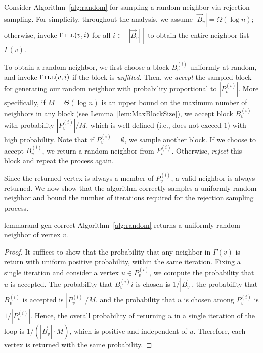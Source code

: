 Consider Algorithm~\ref{alg:random} for sampling a random neighbor via rejection sampling.
For simplicity, throughout the analysis, we assume $|\vec B_v| = \Omega(\log n)$;
otherwise, invoke $\texttt{\textsc{Fill}}(v,i)$ for all $i \in [|\vec B_v|]$ to obtain the entire neighbor list $\Gamma(v)$.

To obtain a random neighbor, we first choose a block $B^{(i)}_v$ uniformly at random, and invoke $\texttt{\textsc{Fill}}(v,i)$ if the block is \emph{unfilled}.
Then, we \emph{accept} the sampled block for generating our random neighbor with probability proportional to $|P_v^{(i)}|$.
More specifically, if $M = \Theta(\log n)$ is an upper bound on the maximum number of neighbors in any block (see Lemma~\ref{lem:MaxBlockSize}),
we accept block $B^{(i)}_v$ with probability $|P_v^{(i)}|/M$, which is well-defined (i.e., does not exceed $1$) with high probability.
Note that if $P_v^{(i)} = \emptyset$, we sample another block.
If we choose to accept $B^{(i)}_v$, we return a random neighbor from $P_v^{(i)}$.
Otherwise, \emph{reject} this block and repeat the process again.

Since the returned vertex is always a member of $P_v^{(i)}$, a valid neighbor is always returned.
We now show that the algorithm correctly samples a uniformly random neighbor
and bound the number of iterations required for the rejection sampling process.
\begin{restatable}{lemma}{rand-gen-correct}
\label{lem:rand_gen_correct}
Algorithm~\ref{alg:random} returns a uniformly random neighbor of vertex $v$.
\end{restatable}
\begin{proof}
It suffices to show that the probability that any neighbor in $\Gamma(v)$ is return with uniform positive probability, within the same iteration.
Fixing a single iteration and consider a vertex $u\in P_v^{(i)}$, we compute the probability that $u$ is accepted.
The probability that $B^{(i)}_vi$ is chosen is $1/|\vec B_v|$, the probability that $B^{(i)}_v$ is accepted is $|P_v^{(i)}|/M$,
and the probability that $u$ is chosen among $P_v^{(i)}$ is $1/|P_v^{(i)}|$.
Hence, the overall probability of returning $u$ in a single iteration
of the loop is $1/(|\vec B_v|\cdot M)$, which is positive and independent of $u$.
Therefore, each vertex is returned with the same probability.
\end{proof}

